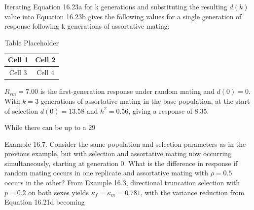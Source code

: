 \documentclass{article}
\begin{document}
Iterating Equation 16.23a for k generations and substituting the resulting  $ d(k) $ value into Equation 16.23b gives the following values for a single generation of response following k generations of assortative mating:

\begin{table}[h]
\centering
\begin{tabular}{|c|c|}
\hline
Cell 1 & Cell 2 \\
\hline
Cell 3 & Cell 4 \\
\hline
\end{tabular}
\caption{Table Placeholder}
\end{table}

 $ R_{rm} = 7.00 $ is the first-generation response under random mating and  $ d(0) = 0 $. With  $ k = 3 $ generations of assortative mating in the base population, at the start of selection  $ d(0) = 13.58 $ and  $ h^2 = 0.56 $, giving a response of 8.35.

While there can be up to a 29%

Example 16.7. Consider the same population and selection parameters as in the previous example, but with selection and assortative mating now occurring simultaneously, starting at generation 0. What is the difference in response if random mating occurs in one replicate and assortative mating with  $ \rho = 0.5 $ occurs in the other? From Example 16.3, directional truncation selection with  $ p = 0.2 $ on both sexes yields  $ \kappa_f = \kappa_m = 0.781 $, with the variance reduction from Equation 16.21d becoming
\end{document}
